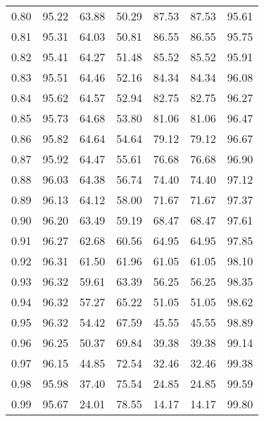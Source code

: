 \begin{tabular}{|c|c|c|c|c|c|c|}
      0.80 &     95.22 &     63.88 &      50.29 &   87.53 &      87.53 &         95.61 \\
      0.81 &     95.31 &     64.03 &      50.81 &   86.55 &      86.55 &         95.75 \\
      0.82 &     95.41 &     64.27 &      51.48 &   85.52 &      85.52 &         95.91 \\
      0.83 &     95.51 &     64.46 &      52.16 &   84.34 &      84.34 &         96.08 \\
      0.84 &     95.62 &     64.57 &      52.94 &   82.75 &      82.75 &         96.27 \\
      0.85 &     95.73 &     64.68 &      53.80 &   81.06 &      81.06 &         96.47 \\
      0.86 &     95.82 &     64.64 &      54.64 &   79.12 &      79.12 &         96.67 \\
      0.87 &     95.92 &     64.47 &      55.61 &   76.68 &      76.68 &         96.90 \\
      0.88 &     96.03 &     64.38 &      56.74 &   74.40 &      74.40 &         97.12 \\
      0.89 &     96.13 &     64.12 &      58.00 &   71.67 &      71.67 &         97.37 \\
      0.90 &     96.20 &     63.49 &      59.19 &   68.47 &      68.47 &         97.61 \\
      0.91 &     96.27 &     62.68 &      60.56 &   64.95 &      64.95 &         97.85 \\
      0.92 &     96.31 &     61.50 &      61.96 &   61.05 &      61.05 &         98.10 \\
      0.93 &     96.32 &     59.61 &      63.39 &   56.25 &      56.25 &         98.35 \\
      0.94 &     96.32 &     57.27 &      65.22 &   51.05 &      51.05 &         98.62 \\
      0.95 &     96.32 &     54.42 &      67.59 &   45.55 &      45.55 &         98.89 \\
      0.96 &     96.25 &     50.37 &      69.84 &   39.38 &      39.38 &         99.14 \\
      0.97 &     96.15 &     44.85 &      72.54 &   32.46 &      32.46 &         99.38 \\
      0.98 &     95.98 &     37.40 &      75.54 &   24.85 &      24.85 &         99.59 \\
      0.99 &     95.67 &     24.01 &      78.55 &   14.17 &      14.17 &         99.80 \\
\bottomrule
\end{tabular}
